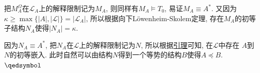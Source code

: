 \documentclass[UTF8]{ctexart}
\begin{document}
把$M_A^\Omega$在$\mathcal{L}_A$上的解释限制记为$M_A$, 则同样有$M_A\models T_0$,
易证$M_A\equiv A^*$.
又因为$\kappa\geqslant\max\{|A|,|\mathcal{L}|\}=|\mathcal{L}_A|$,
所以根据向下Löwenheim-Skolem定理, 存在$M_A$的初等子结构$N_A$使得$|N_A|=\kappa$.

因为$N_A\equiv A^*$, 把$N_A$在$\mathcal{L}$上的解释限制记为$N$,
所以根据\href{02 初等等价#nameddest=sec:定理1.2}{引理}可知, 在$\mathcal{L}$中存在
$A$到$N$的初等嵌入. 此时自然可以由结构$N$得到一个等势的结构$B$使得$A\preccurlyeq B$.
\hfill $\qedsymbol$

\end{document}
